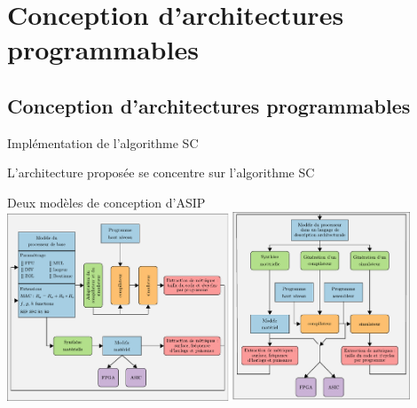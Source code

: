 

\section{Conception d'architectures programmables}



\subsection*{Conception d'architectures programmables}


\begin{frame}[c]{Implémentation de l'algorithme SC}
\vfill
  \begin{table}[t]
    \centering
    {\small{}}
  \end{table}
  \vfill
  \centering
  L'architecture proposée se concentre sur l'algorithme SC
  \vfill
\end{frame}


\begin{frame}[c]{Deux modèles de conception d'ASIP}
  \centering
  \includegraphics[width=0.9\textwidth]{./fig/methodos}
\end{frame}

